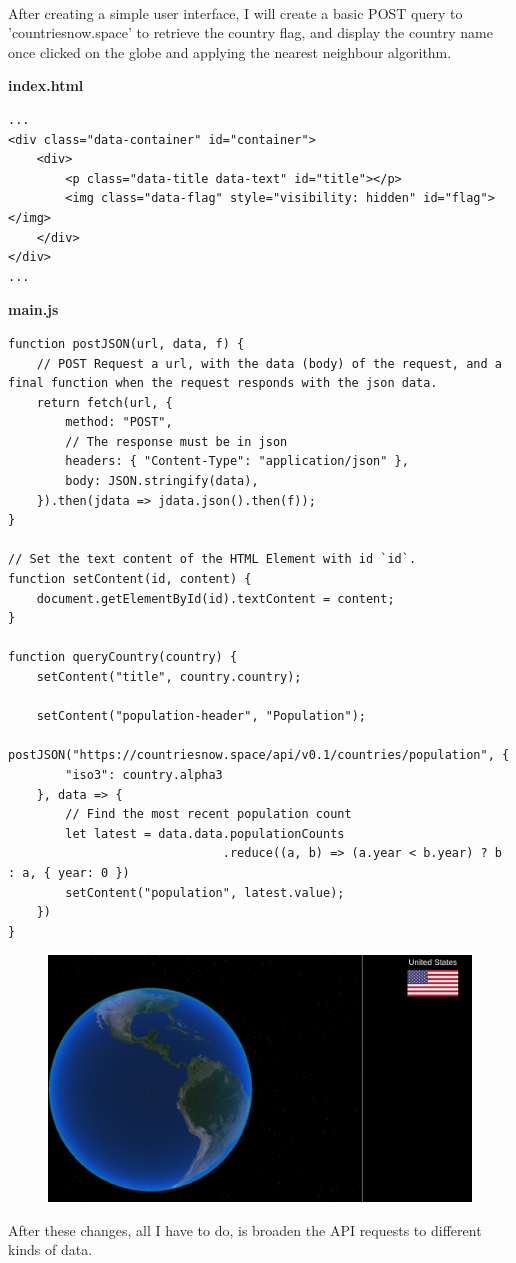 \\ After creating a simple user interface, I will create a basic POST query to 'countriesnow.space' to retrieve the country flag, and display the country name once clicked on the globe and applying the nearest neighbour algorithm.

\textbf{index.html}
\begin{lstlisting}
...
<div class="data-container" id="container">
    <div>
        <p class="data-title data-text" id="title"></p>
        <img class="data-flag" style="visibility: hidden" id="flag"></img>
    </div>
</div>
...
\end{lstlisting}

\textbf{main.js}
\begin{lstlisting}
function postJSON(url, data, f) {
    // POST Request a url, with the data (body) of the request, and a final function when the request responds with the json data.
    return fetch(url, {
        method: "POST",
        // The response must be in json
        headers: { "Content-Type": "application/json" },
        body: JSON.stringify(data),
    }).then(jdata => jdata.json().then(f));
}

// Set the text content of the HTML Element with id `id`.
function setContent(id, content) {
    document.getElementById(id).textContent = content;
}

function queryCountry(country) {
    setContent("title", country.country);

    setContent("population-header", "Population");
    postJSON("https://countriesnow.space/api/v0.1/countries/population", {
        "iso3": country.alpha3
    }, data => {
        // Find the most recent population count
        let latest = data.data.populationCounts
                              .reduce((a, b) => (a.year < b.year) ? b : a, { year: 0 })
        setContent("population", latest.value);
    })
}
\end{lstlisting}
\begin{figure}[ht]
\centering
\includegraphics[width=0.7\linewidth]{images/ui}
\caption{}
\label{fig:ui}
\end{figure}
After these changes, all I have to do, is broaden the API requests to different kinds of data.

